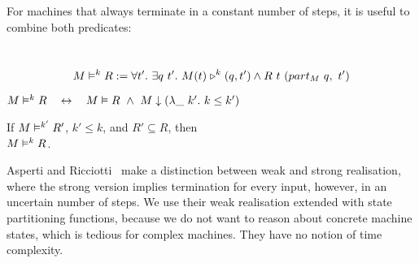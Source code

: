 For machines that always terminate in a constant number of steps, it is useful to combine both predicates:
\begin{definition}
  \label{def:RealiseIn}
  ~
  \[
    M \mathrel{\vDash^{k}} R :=
    \forall t'.~
    \exists q~t'.~
    M(t) \mathrel{\triangleright}^k(q, t') \land R~t~(part_M~q,~t')
  \]
\end{definition}

\begin{lemma}
  \label{lem:Realise_total}
  $
    M \mathrel{\vDash^{k}} R
    \quad\mathbin{\leftrightarrow}\quad
    M \mathrel{\vDash} R ~\land~
    M \mathrel{\downarrow} (\lambda \_~k'.~k \le k')
  $
\end{lemma}

\begin{lemma}
  \label{lem:RealiseIn_monotone}
  If $M \mathrel{\vDash^{k'}} R'$, $k' \leq k$, and $R' \subseteq R$, then \\
  $M \mathrel{\vDash^{k}} R$.
\end{lemma}

Asperti and Ricciotti~\cite{asperti2015} make a distinction between weak and strong realisation, where the strong version implies termination for
every input, however, in an uncertain number of steps.  We use their weak realisation extended with state partitioning functions, because we do not
want to reason about concrete machine states, which is tedious for complex machines.  They have no notion of time complexity.








